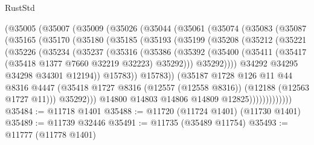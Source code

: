 \begin{lexlean}{RustStd}
\begin{coremodule}
      (@35005
        (@35007
          (@35009
            (@35026
              (@35044
                (@35061
                  (@35074
                    (@35083
                      (@35087
                        (@35165
                          (@35170
                            (@35180
                              (@35185
                                (@35193
                                  (@35199
                                    (@35208
                                      (@35212
                                        (@35221
                                          (@35226
                                            (@35234
                                              (@35237
                                                (@35316
                                                  (@35386
                                                    (@35392
                                                      (@35400
                                                        (@35411
                                                          (@35417
                                                            (@35418 @1377 @7660 @32219 @32223)
                                                            @35292)))
                                                      @35292))))
                                              @34292
                                              @34295
                                              @34298
                                              @34301
                                              @12194))
                                          @15783))
                                      @15783))
                                  (@35187
                                    @1728
                                    @126
                                    @11
                                    @44
                                    @8316
                                    @4447
                                    (@35418
                                      @1727
                                      @8316
                                      (@12557 (@12558 @8316))
                                      (@12188 (@12563 @1727 @11)))
                                    @35292)))
                              @14800
                              @14803
                              @14806
                              @14809
                              @12825)))))))))))))
@35484 := @11718 @1401
@35488 := @11720 (@11724 @1401) (@11730 @1401)
@35489 := @11739 @32446
@35491 := @11735 (@35489 @11754)
@35493 := @11777 (@11778 @1401)

\end{coremodule}
\end{lexlean}
